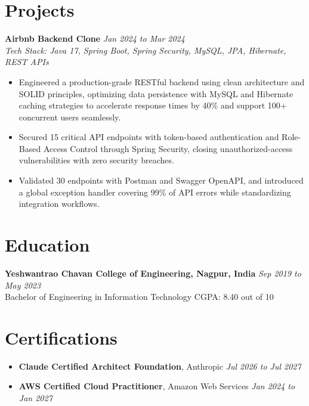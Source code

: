 \documentclass[10pt, letterpaper]{article}
\begin{document}
\section{Projects}

\textbf{Airbnb Backend Clone} \hfill \textit{Jan 2024 to Mar 2024} \\
\textit{Tech Stack: Java 17, Spring Boot, Spring Security, MySQL, JPA, Hibernate, REST APIs}
\begin{itemize}[leftmargin=0.2in, itemsep=1pt, parsep=0pt, topsep=2pt]
    \item Engineered a production-grade RESTful backend using clean architecture and SOLID principles, optimizing data persistence with MySQL and Hibernate caching strategies to accelerate response times by 40\% and support 100+ concurrent users seamlessly.
    \item Secured 15 critical API endpoints with token-based authentication and Role-Based Access Control through Spring Security, closing unauthorized-access vulnerabilities with zero security breaches.
    \item Validated 30 endpoints with Postman and Swagger OpenAPI, and introduced a global exception handler covering 99\% of API errors while standardizing integration workflows.
\end{itemize}

\section{Education}
\textbf{Yeshwantrao Chavan College of Engineering, Nagpur, India} \hfill \textit{Sep 2019 to May 2023} \\
Bachelor of Engineering in Information Technology \hfill CGPA: 8.40 out of 10

\section{Certifications}
\begin{itemize}[leftmargin=0.2in, itemsep=1pt, parsep=0pt, topsep=2pt]
    \item \textbf{Claude Certified Architect Foundation}, Anthropic \hfill \textit{Jul 2026 to Jul 2027}
    \item \textbf{AWS Certified Cloud Practitioner}, Amazon Web Services \hfill \textit{Jan 2024 to Jan 2027}
\end{itemize}
\end{document}
